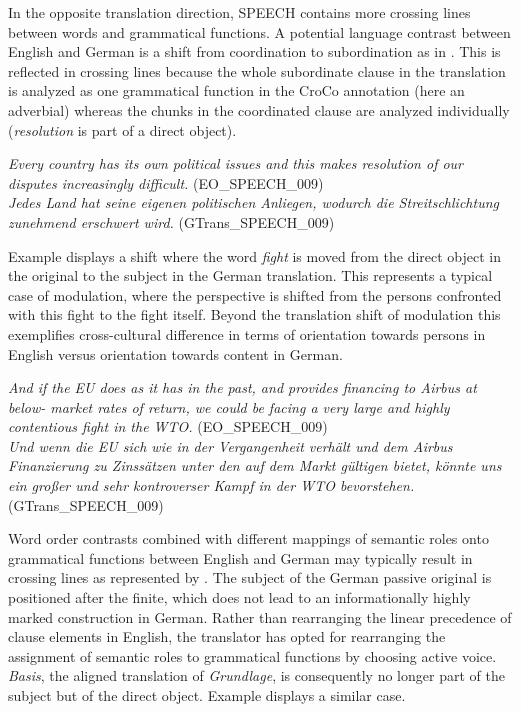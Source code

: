 \documentclass[output=paper]{LSP/langsci}
\begin{document}
In the opposite translation direction, SPEECH contains more crossing lines between words and grammatical functions. A potential language contrast between English and German is a shift from coordination to subordination as in . This is reflected in crossing lines because the whole subordinate clause in the translation is analyzed as one grammatical function in the CroCo annotation (here an adverbial) whereas the chunks in the coordinated clause are analyzed individually (\textit{resolution} is part of a direct object). 


\ea \label{ex:culo:27}
     \ea \textit{Every country has its own political issues and this makes resolution of our disputes increasingly difficult.} (EO\_SPEECH\_009)\\
      \ex \textit{Jedes Land hat seine eigenen politischen Anliegen, wodurch die Streitschlichtung zunehmend erschwert wird.} (GTrans\_SPEECH\_009) 
      \z
\z

Example  displays a shift where the word \textit{fight} is moved from the direct object in the original to the subject in the German translation. This represents a typical case of modulation, where the perspective is shifted from the persons confronted with this fight to the fight itself. Beyond the translation shift of modulation this exemplifies  cross-cultural difference in terms of orientation towards persons in English versus orientation towards content in German. 

\ea \label{ex:culo:28}
   \ea \textit{And if the EU does as it has in the past, and provides financing to Airbus at below-  market rates of return, we could be facing a very large and highly contentious fight in the WTO.} (EO\_SPEECH\_009)\\
    \ex \textit{Und wenn die EU sich wie in der Vergangenheit verhält und dem Airbus Finanzierung zu Zinssätzen unter den auf dem Markt gültigen bietet, könnte uns ein großer und sehr kontroverser Kampf in der WTO bevorstehen.} (GTrans\_SPEECH\_009) 
    \z
\z

Word order contrasts combined with different mappings of semantic roles onto grammatical functions between English and German may typically result in crossing lines as represented by . The subject of the German passive original is positioned after the finite, which does not lead to an informationally highly marked construction in German. Rather than rearranging the linear precedence of clause elements in English, the translator has opted for rearranging the assignment of semantic roles to grammatical functions by choosing active voice. \textit{Basis}, the aligned translation of \textit{Grundlage}, is consequently no longer part of the subject but of the direct object. Example  displays a similar case. 
\end{document}
